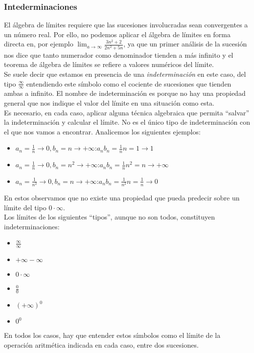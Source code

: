 \documentclass[../Teoría.root.tex]{subfiles}
\begin{document}
\subsubsection{Intederminaciones}
El álgebra de límites requiere que las sucesiones involucradas sean convergentes a un número real.
Por ello, no podemos aplicar el álgebra de límites en forma directa en, por ejemplo \(\lim_{a\to\infty}\frac{3n^2+2}{2n^2+5n}\), ya que un primer análisis de la sucesión nos dice que tanto numerador como denominador tienden a más infinito y el teorema de álgebra de límites se refiere a valores numéricos del límite.\\
Se suele decir que estamos en presencia de una \textit{indeterminación} en este caso, del tipo \(\frac{\infty}{\infty}\) entendiendo este símbolo como el cociente de sucesiones que tienden ambas a infinito.
El nombre de indeterminación es porque no hay una propiedad general que nos indique el valor del límite en una situación como esta.\\
Es necesario, en cada caso, aplicar alguna técnica algebraica que permita “salvar” la indeterminación y calcular el límite.
No es el único tipo de indeterminación con el que nos vamos a encontrar.
Analicemos los siguientes ejemplos:
\begin{itemize}
    \item \(a_n=\frac{1}{n}\rightarrow0,b_n=n\rightarrow+\infty\):\tab\(a_nb_n=\frac{1}{n}n=1\rightarrow1\)
    \item \(a_n=\frac{1}{n}\rightarrow0,b_n=n^2\rightarrow+\infty\):\tab\(a_nb_n=\frac{1}{n}n^2=n\rightarrow+\infty\)
    \item \(a_n=\frac{1}{n^2}\rightarrow0,b_n=n\rightarrow+\infty\):\tab\(a_nb_n=\frac{1}{n^2}n=\frac{1}{n}\rightarrow0\)
\end{itemize}
En estos observamos que no existe una propiedad que pueda predecir sobre un límite del tipo \(0\cdot\infty\).\\
Los límites de los siguientes “tipos”, aunque no son todos, constituyen indeterminaciones:
\begin{itemize}
    \item \(\frac{\infty}{\infty}\)
    \item \(+\infty-\infty\)
    \item \(0\cdot\infty\)
    \item \(\frac{0}{0}\)
    \item \((+\infty)^0\)
    \item \(0^0\)
\end{itemize}
En todos los casos, hay que entender estos símbolos como el límite de la operación aritmética indicada en cada caso, entre dos sucesiones.\\
\end{document}
